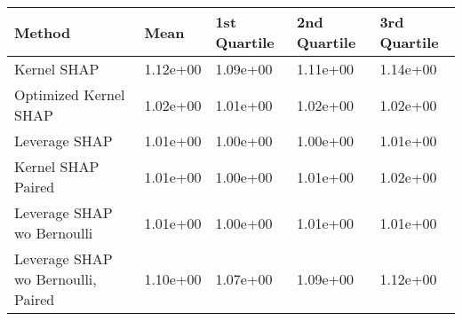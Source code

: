 \begin{tabular}{lllll}
  \toprule
  \textbf{Method} & \textbf{Mean} & \textbf{1st Quartile} & \textbf{2nd Quartile} & \textbf{3rd Quartile} \\ \midrule 
Kernel SHAP & 1.12e+00 & 1.09e+00 & 1.11e+00 & 1.14e+00\\
Optimized Kernel SHAP & 1.02e+00 & 1.01e+00 & 1.02e+00 & \cellcolor{bronze!60}1.02e+00\\
Leverage SHAP & \cellcolor{gold!60}1.01e+00 & \cellcolor{gold!60}1.00e+00 & \cellcolor{gold!60}1.00e+00 & \cellcolor{gold!60}1.01e+00\\
Kernel SHAP Paired & \cellcolor{gold!60}1.01e+00 & \cellcolor{gold!60}1.00e+00 & \cellcolor{silver!60}1.01e+00 & \cellcolor{bronze!60}1.02e+00\\
Leverage SHAP wo Bernoulli & \cellcolor{gold!60}1.01e+00 & \cellcolor{gold!60}1.00e+00 & \cellcolor{silver!60}1.01e+00 & \cellcolor{gold!60}1.01e+00\\
Leverage SHAP wo Bernoulli, Paired & 1.10e+00 & 1.07e+00 & 1.09e+00 & 1.12e+00\\
\bottomrule
\end{tabular}